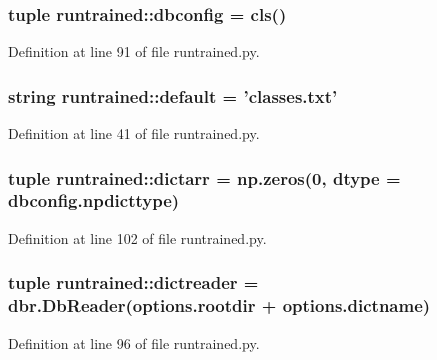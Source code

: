 \hypertarget{namespaceruntrained_a61e7eef55d8919327ea79f96cc9e9b7f}{
\subsubsection[{dbconfig}]{\setlength{\rightskip}{0pt plus 5cm}tuple {\bf runtrained::dbconfig} = {\bf cls}()}}
\label{namespaceruntrained_a61e7eef55d8919327ea79f96cc9e9b7f}


Definition at line 91 of file runtrained.py.

\hypertarget{namespaceruntrained_a444d9fa1b0629211e1fccae2f9bb06fb}{
\subsubsection[{default}]{\setlength{\rightskip}{0pt plus 5cm}string {\bf runtrained::default} = 'classes.txt'}}
\label{namespaceruntrained_a444d9fa1b0629211e1fccae2f9bb06fb}


Definition at line 41 of file runtrained.py.

\hypertarget{namespaceruntrained_ab856260e49d1dca1bbdabe16218f90bb}{
\subsubsection[{dictarr}]{\setlength{\rightskip}{0pt plus 5cm}tuple {\bf runtrained::dictarr} = np.zeros(0, dtype = dbconfig.npdicttype)}}
\label{namespaceruntrained_ab856260e49d1dca1bbdabe16218f90bb}


Definition at line 102 of file runtrained.py.

\hypertarget{namespaceruntrained_a1593f2f52d1b27e50d8576ba7f72ef1e}{
\subsubsection[{dictreader}]{\setlength{\rightskip}{0pt plus 5cm}tuple {\bf runtrained::dictreader} = dbr.DbReader(options.rootdir + options.dictname)}}
\label{namespaceruntrained_a1593f2f52d1b27e50d8576ba7f72ef1e}


Definition at line 96 of file runtrained.py.

